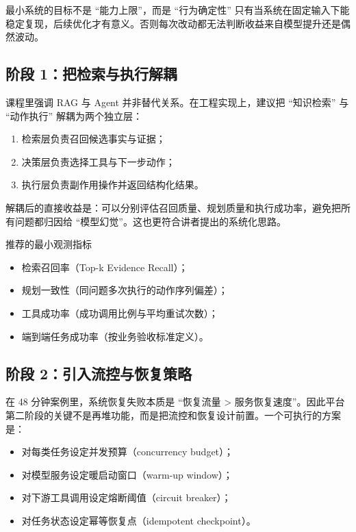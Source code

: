 \documentclass[a4paper]{article}
\begin{document}
\begin{importantbox}{最小系统的目标不是 ``能力上限''，而是 ``行为确定性''}
只有当系统在固定输入下能稳定复现，后续优化才有意义。否则每次改动都无法判断收益来自模型提升还是偶然波动。
\end{importantbox}

\subsection{阶段 1：把检索与执行解耦}
课程里强调 RAG 与 Agent 并非替代关系。在工程实现上，建议把 ``知识检索'' 与 ``动作执行'' 解耦为两个独立层：
\begin{enumerate}
    \item 检索层负责召回候选事实与证据；
    \item 决策层负责选择工具与下一步动作；
    \item 执行层负责副作用操作并返回结构化结果。
\end{enumerate}

解耦后的直接收益是：可以分别评估召回质量、规划质量和执行成功率，避免把所有问题都归因给 ``模型幻觉''。这也更符合讲者提出的系统化思路。

\begin{knowledgebox}{推荐的最小观测指标}
\begin{itemize}
    \item 检索召回率（Top-k Evidence Recall）；
    \item 规划一致性（同问题多次执行的动作序列偏差）；
    \item 工具成功率（成功调用比例与平均重试次数）；
    \item 端到端任务成功率（按业务验收标准定义）。
\end{itemize}
\end{knowledgebox}

\subsection{阶段 2：引入流控与恢复策略}
在 48 分钟案例里，系统恢复失败本质是 ``恢复流量 > 服务恢复速度''。因此平台第二阶段的关键不是再堆功能，而是把流控和恢复设计前置。一个可执行的方案是：
\begin{itemize}
    \item 对每类任务设定并发预算（concurrency budget）；
    \item 对模型服务设定暖启动窗口（warm-up window）；
    \item 对下游工具调用设定熔断阈值（circuit breaker）；
    \item 对任务状态设定幂等恢复点（idempotent checkpoint）。
\end{itemize}
\end{document}
